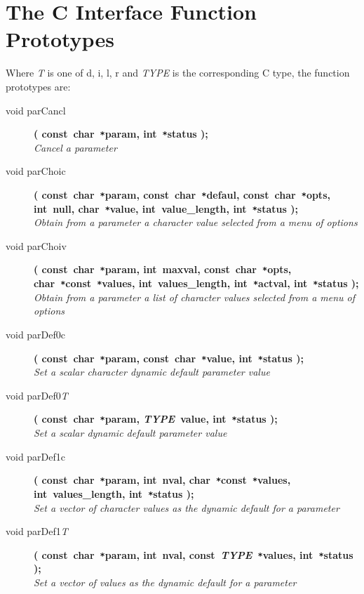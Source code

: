 \documentclass[twoside,11pt,nolof]{starlink}
\begin{document}
\section{The C Interface Function Prototypes}
Where \textit{T} is one of d, i, l, r and \textit{TYPE} is the corresponding C
type, the function prototypes are:
\begin{flushleft}
\begin{description}
\item[void parCancl]
\textbf{( const~char~\texttt{*}param, int~\texttt{*}status );}\\
\textit{Cancel a parameter}
\item[void parChoic]
\textbf{( const~char~\texttt{*}param, const~char~\texttt{*}defaul,
               const~char~\texttt{*}opts, int~null, char~\texttt{*}value,
               int~value\_length, int~\texttt{*}status );} \\
\textit{Obtain from a parameter a character value selected from a menu
            of options}
\item[void parChoiv]
\textbf{( const~char~\texttt{*}param, int~maxval, const~char~\texttt{*}opts,
               char~\texttt{*}const~\texttt{*}values, int~values\_length,
               int~\texttt{*}actval, int~\texttt{*}status );} \\
\textit{Obtain from a parameter a list of character values selected from
            a menu of options}
\item[void parDef0c]
\textbf{( const~char~\texttt{*}param, const~char~\texttt{*}value,
          int~\texttt{*}status );}\\
\textit{Set a scalar character dynamic default parameter value}
\item[void parDef0\textit{T}]
\textbf{( const~char~\texttt{*}param, \textit{TYPE}~value,
          int~\texttt{*}status );}\\
\textit{Set a scalar dynamic default parameter value}
\item[void parDef1c]
\textbf{( const~char~\texttt{*}param, int~nval,
          char~\texttt{*}const~\texttt{*}values, int~values\_length,
          int~\texttt{*}status );} \\
\textit{Set a vector of character values as the dynamic default for a parameter}
\item[void parDef1\textit{T}]
\textbf{( const~char~\texttt{*}param, int~nval,
          const~\textit{TYPE}~\texttt{*}values, int~\texttt{*}status );}\\
\textit{Set a vector of values as the dynamic default for a parameter}

\end{description}
\end{flushleft}
\end{document}
